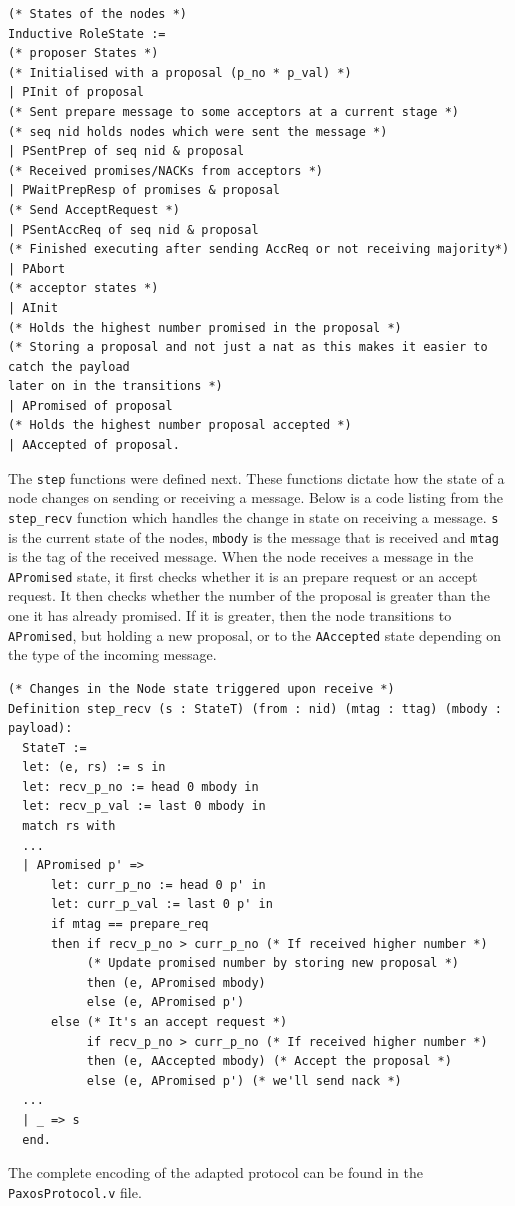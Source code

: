 \begin{lstlisting}
(* States of the nodes *)
Inductive RoleState :=
(* proposer States *)
(* Initialised with a proposal (p_no * p_val) *)
| PInit of proposal
(* Sent prepare message to some acceptors at a current stage *)
(* seq nid holds nodes which were sent the message *)
| PSentPrep of seq nid & proposal
(* Received promises/NACKs from acceptors *)
| PWaitPrepResp of promises & proposal
(* Send AcceptRequest *)
| PSentAccReq of seq nid & proposal
(* Finished executing after sending AccReq or not receiving majority*)
| PAbort
(* acceptor states *)
| AInit
(* Holds the highest number promised in the proposal *)
(* Storing a proposal and not just a nat as this makes it easier to catch the payload
later on in the transitions *)
| APromised of proposal
(* Holds the highest number proposal accepted *)
| AAccepted of proposal.
\end{lstlisting}

The \texttt{step} functions were defined next. These functions dictate how the state
of a node changes on sending or receiving a message. Below is a code listing
from the \texttt{step\_recv} function which handles the change in state on
receiving a message. \texttt{s} is the current state of the nodes,
\texttt{mbody} is the message that is received and \texttt{mtag} is the tag
of the received message. When the node receives a message in the \texttt{APromised}
state, it first checks whether it is an prepare request or an accept request.
It then checks whether the number of the proposal is greater than the one it has
already promised. If it is greater, then the node transitions to \texttt{APromised},
but holding a new proposal, or to the \texttt{AAccepted} state depending on the
type of the incoming message.

\begin{lstlisting}
(* Changes in the Node state triggered upon receive *)
Definition step_recv (s : StateT) (from : nid) (mtag : ttag) (mbody : payload):
  StateT :=
  let: (e, rs) := s in
  let: recv_p_no := head 0 mbody in
  let: recv_p_val := last 0 mbody in
  match rs with
  ...
  | APromised p' =>
      let: curr_p_no := head 0 p' in
      let: curr_p_val := last 0 p' in
      if mtag == prepare_req
      then if recv_p_no > curr_p_no (* If received higher number *)
           (* Update promised number by storing new proposal *)
           then (e, APromised mbody)
           else (e, APromised p')
      else (* It's an accept request *)
           if recv_p_no > curr_p_no (* If received higher number *)
           then (e, AAccepted mbody) (* Accept the proposal *)
           else (e, APromised p') (* we'll send nack *)
  ...
  | _ => s
  end.
\end{lstlisting}

The complete encoding of the adapted protocol can be found in the
\texttt{PaxosProtocol.v} file.
